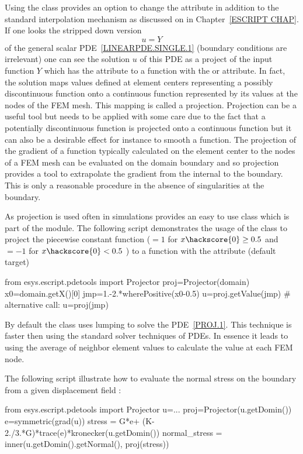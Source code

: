 Using the \LinearPDE class provides an option to change the \FunctionSpace attribute in addition
to the standard interpolation mechanism as
discussed on in Chapter~\ref{ESCRIPT CHAP}. If one looks the
stripped down version 
\begin{equation}\label{PROJ.1}
u = Y
\end{equation}
of the general scalar PDE~\ref{LINEARPDE.SINGLE.1} (boundary conditions are irrelevant) 
one can see the solution $u$ of this PDE as a project of the input function $Y$
which has the \Function attribute to a function with the \SolutionFS or \ReducedSolutionFS
attribute. In fact, the solution maps values defined at 
element centers representing a possibly discontinuous function 
onto a continuous function represented by its values at the nodes of the FEM mesh. 
This mapping is called a projection. Projection 
can be a useful tool but needs to be applied with some care due to the fact that
a potentially discontinuous function is projected onto a continuous function but it can
also be a desirable effect for instance to smooth a function. The projection of the
gradient of a function typically calculated on the element center to the 
nodes of a FEM mesh can be evaluated on the domain boundary and so projection provides a tool to extrapolate 
the gradient from the internal to the boundary. This is only a reasonable procedure in the absence of singularities at the boundary. 

As projection is used often in simulations \escript provides an easy to use class 
which is part of the \pdetools module. The following script demonstrates
the usage of the class to project the piecewise constant function ($=1$ for $x\hackscore{0}\ge 0.5$ and
$=-1$ for $x\hackscore{0}<0.5$ ) to a function with the \ReducedSolutionFS attribute (default target) 
\begin{python}
from esys.escript.pdetools import Projector
proj=Projector(domain)
x0=domain.getX()[0]
jmp=1.-2.*wherePositive(x0-0.5)
u=proj.getValue(jmp)
# alternative call:
u=proj(jmp)
\end{python}
By default the class uses lumping to solve the PDE~\ref{PROJ.1}. This technique is faster
then using the standard solver techniques of PDEs. In essence it leads to using the average of
neighbor element values to calculate the value at each FEM node. 

The following script illustrate how to evaluate the normal stress
on the boundary from a given displacement field :
\begin{python}
from esys.escript.pdetools import Projector
u=...
proj=Projector(u.getDomin())
e=symmetric(grad(u))
stress = G*e+ (K-2./3.*G)*trace(e)*kronecker(u.getDomin())
normal_stress = inner(u.getDomin().getNormal(), proj(stress))
\end{python}




